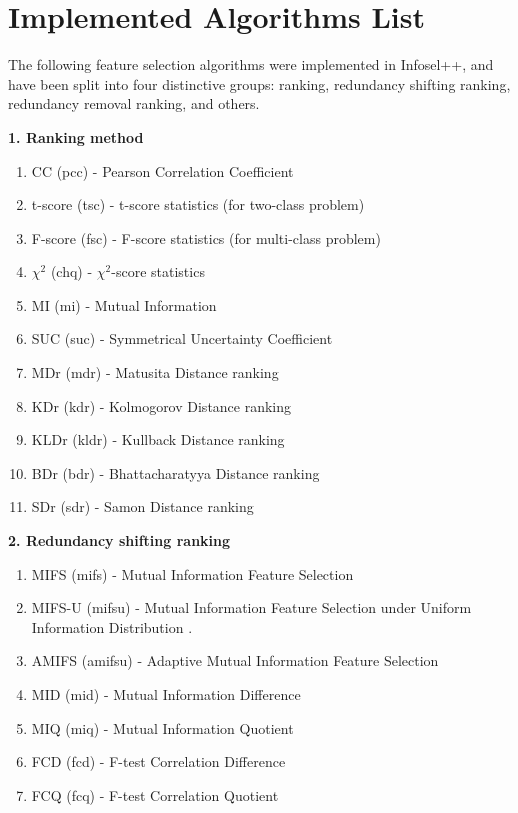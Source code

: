 \documentclass[a4paper,fleqn]{report}
\begin{document}
\section{Implemented Algorithms List} \label{sec:InfoselImplAlgh}

The following feature selection algorithms were implemented in Infosel++, and have been split into four distinctive groups:
ranking, redundancy shifting ranking, redundancy removal ranking, and others. 

{\bf 1. Ranking method}
\begin{enumerate}
\item CC (pcc) - Pearson Correlation Coefficient \cite{Press1988,Duch2004}
\item t-score (tsc) - t-score statistics (for two-class problem) \cite{Golub1999,Duch2004}
\item F-score (fsc) - F-score statistics (for multi-class problem) \cite{Peng2005a}
\item $ \chi^{2} $ (chq) - $\chi^2$-score statistics \cite{Duch2004a,Duch2004}
\item MI (mi) - Mutual Information \cite{Vilmansen1973,Duch2004}
\item SUC (suc)  - Symmetrical Uncertainty Coefficient \cite{Press1988,Duch2004}
\item MDr (mdr) - Matusita Distance ranking\cite{Vilmansen1973,Duch2004}
\item KDr (kdr) - Kolmogorov Distance ranking\cite{Vilmansen1973,Duch2004}
\item KLDr (kldr) - Kullback Distance ranking \cite{Vilmansen1973,Duch2004}
\item BDr (bdr) - Bhattacharatyya Distance ranking \cite{Vilmansen1973,Duch2004}
\item SDr (sdr) - Samon Distance ranking \cite{Vilmansen1973,Duch2004}
\end{enumerate}

{\bf 2. Redundancy shifting ranking}
\begin{enumerate}
\item MIFS (mifs) - Mutual Information Feature Selection \cite{Battiti1994}
\item MIFS-U (mifsu) - Mutual Information Feature Selection under Uniform Information Distribution \cite{Kwak2002}.
\item AMIFS (amifsu) - Adaptive Mutual Information Feature Selection \cite{Tesmer2004}
\item MID (mid) - Mutual Information Difference \cite{Peng2005a}
\item MIQ (miq) - Mutual Information Quotient \cite{Peng2005a}
\item FCD (fcd) - F-test Correlation Difference \cite{Peng2005a}
\item FCQ (fcq) - F-test Correlation Quotient \cite{Peng2005a}
\end{enumerate}
\end{document}

